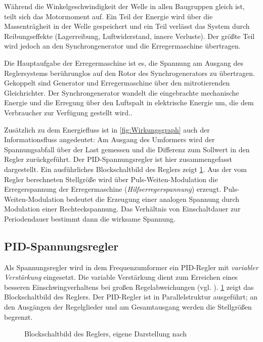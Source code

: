Während die Winkelgeschwindigkeit der Welle in allen Baugruppen gleich ist, teilt sich das Motormoment auf. Ein Teil der Energie wird über die Massenträgheit in der Welle gespeichert und ein Teil verlässt das System durch Reibungseffekte (Lagerreibung, Luftwiderstand, innere Verluste). Der größte Teil wird jedoch an den Synchrongenerator und die Erregermaschine übertragen.

Die Hauptaufgabe der Erregermaschine ist es, die Spannung am Ausgang des Reglersystems berührunglos auf den Rotor des Synchrogenerators zu übertragen. Gekoppelt sind Generator und Erregermaschine über den mitrotierenden Gleichrichter. Der Synchrongenerator wandelt die eingebrachte mechanische Energie und die Erregung über den Luftspalt in elektrische Energie um, die dem Verbraucher zur Verfügung gestellt wird..

Zusätzlich zu dem Energiefluss ist in \cref{fig:Wirkungsgraph} auch der Informationsfluss angedeutet: Am Ausgang des Umformers wird der Spannungsabfall über der Last gemessen und die Differenz zum Sollwert in den Regler zurückgeführt. Der PID-Spannungsregler ist hier zusammengefasst dargestellt. Ein ausführliches Blockschaltbild des Reglers zeigt \cref{fig:Blockschaltbild_Regler}. Aus der vom Regler berechneten Stellgröße wird über Puls-Weiten-Modulation die Erregerspannung der Erregermaschine (\emph{Hilfserregerspannung}) erzeugt. Puls-Weiten-Modulation bedeutet die Erzeugung einer analogen Spannung durch Modulation einer Rechteckspannung. Das Verhältnis von Einschaltdauer zur Periodendauer bestimmt dann die wirksame Spannung. 

\subsection{PID-Spannungsregler}\label{sec:pid-spannungsregler}

Als Spannungsregler wird in dem Frequenzumformer ein PID-Regler mit \emph{variabler Verstärkung} eingesetzt. Die variable Verstärkung dient zum Erreichen eines besseren Einschwingverhaltens bei großen Regelabweichungen (vgl. \cite{pillerpowersystemsDigitalerSpannungsreglerSoftwaredokumentation1997}). \cref{fig:Blockschaltbild_Regler} zeigt das Blockschaltbild des Reglers. Der PID-Regler ist in Parallelstruktur ausgeführt; an den Ausgängen der Regelglieder und am Gesamtausgang werden die Stellgrößen begrenzt. 

\begin{figure}
    \centering
    
    \caption{Blockschaltbild des Reglers, eigene Darstellung nach \cite{pillerpowersystemsGenBsb11APOJET1999}}
    \label{fig:Blockschaltbild_Regler}
\end{figure}

